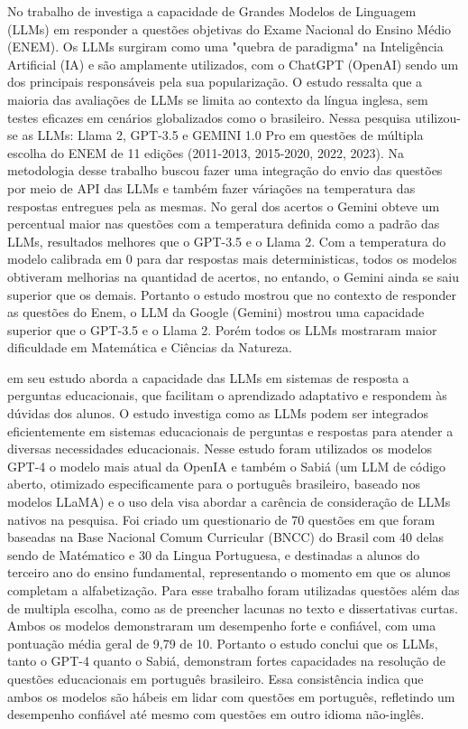 No trabalho de \textcite{raposo2024avaliaccao} investiga a capacidade de Grandes Modelos de Linguagem (LLMs) em responder a questões objetivas do Exame Nacional do Ensino Médio (ENEM). Os LLMs surgiram como uma "quebra de paradigma" na Inteligência Artificial (IA) e são amplamente utilizados, com o ChatGPT (OpenAI) sendo um dos principais responsáveis pela sua popularização. O estudo ressalta que a maioria das avaliações de LLMs se limita ao contexto da língua inglesa, sem testes eficazes em cenários globalizados como o brasileiro. Nessa pesquisa utilizou-se as LLMs: Llama 2, GPT-3.5 e GEMINI 1.0 Pro em questões de múltipla escolha do ENEM de 11 edições (2011-2013, 2015-2020, 2022, 2023). Na metodologia desse trabalho buscou fazer uma integração do envio das questões por meio de API das LLMs e também fazer váriações na temperatura das respostas entregues pela as mesmas. No geral dos acertos o Gemini obteve um percentual maior nas questões com a temperatura definida como a padrão das LLMs, resultados melhores que o GPT-3.5 e o Llama 2. Com a temperatura do modelo calibrada em 0 para dar respostas mais deterministicas, todos os modelos obtiveram melhorias na quantidad de acertos, no entando, o Gemini ainda se saiu superior que os demais. Portanto o estudo mostrou que no contexto de responder as questões do Enem, o LLM da Google (Gemini) mostrou uma capacidade superior que o GPT-3.5 e o Llama 2. Porém todos os LLMs mostraram maior dificuldade em Matemática e Ciências da Natureza.

\textcite{rodrigues2025llms} em seu estudo aborda a capacidade das LLMs em sistemas de resposta a perguntas educacionais, que facilitam o aprendizado adaptativo e respondem às dúvidas dos alunos. O estudo investiga como as LLMs podem ser integrados eficientemente em sistemas educacionais de perguntas e respostas para atender a diversas necessidades educacionais.  Nesse estudo foram utilizados os modelos GPT-4 o modelo mais atual da OpenIA e também o Sabiá (um LLM de código aberto, otimizado especificamente para o português brasileiro, baseado nos modelos LLaMA) e o uso dela visa abordar a carência de consideração de LLMs nativos na pesquisa. Foi criado um questionario de 70 questões em que foram baseadas na Base Nacional Comum Curricular (BNCC) do Brasil com 40 delas sendo de Matématico e 30 da Lingua Portuguesa, e destinadas a alunos do terceiro ano do ensino fundamental, representando o momento em que os alunos completam a alfabetização. Para esse trabalho foram utilizadas questões além das de multipla escolha, como as de preencher lacunas no texto e dissertativas curtas. Ambos os modelos demonstraram um desempenho forte e confiável, com uma pontuação média geral de 9,79 de 10. Portanto o estudo conclui que os LLMs, tanto o GPT-4 quanto o Sabiá, demonstram fortes capacidades na resolução de questões educacionais em português brasileiro. Essa consistência indica que ambos os modelos são hábeis em lidar com questões em português, refletindo um desempenho confiável até mesmo com questões em outro idioma não-inglês.